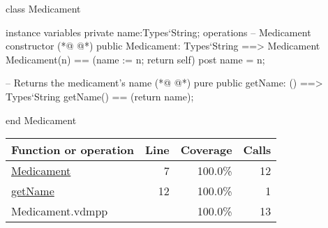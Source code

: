 \begin{vdmpp}[breaklines=true]
class Medicament

instance variables
  private name:Types`String;
operations
 -- Medicament constructor
(*@
\label{Medicament:7}
@*)
 public Medicament: Types`String ==> Medicament
  Medicament(n) == (name := n; return self)
 post name = n;
 
 -- Returns the medicament's name
(*@
\label{getName:12}
@*)
 pure public getName: () ==> Types`String
  getName() == (return name);

end Medicament
\end{vdmpp}
\bigskip
\begin{longtable}{|l|r|r|r|}
\hline
Function or operation & Line & Coverage & Calls \\
\hline
\hline
\hyperref[Medicament:7]{Medicament} & 7&100.0\% & 12 \\
\hline
\hyperref[getName:12]{getName} & 12&100.0\% & 1 \\
\hline
\hline
Medicament.vdmpp & & 100.0\% & 13 \\
\hline
\end{longtable}

